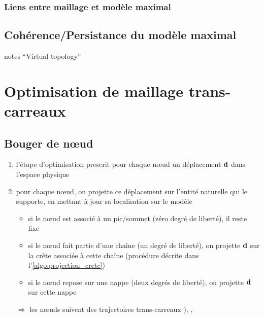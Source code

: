 \subsubsection{Liens entre maillage et modèle maximal}



\subsection{Cohérence/Persistance du modèle maximal}
\cf notes ``Virtual topology''









\section{Optimisation de maillage trans-carreaux}

\subsection{Bouger de n\oe ud}
\label{section:projection_surface_composite}
\begin{enumerate}
	\item l'étape d'optimisation prescrit pour chaque n\oe ud un déplacement $\mathbf{d}$ dans l'espace physique
	\item pour chaque n\oe ud, on projette ce déplacement sur l'entité naturelle qui le supporte, en mettant à jour sa localisation sur le modèle \brep
	\begin{itemize}
		\item si le n\oe ud est associé à un pic/sommet (zéro degré de liberté), il reste fixe 
		\item si le n\oe ud fait partie d'une chaîne (un degré de liberté), on projette $\mathbf{d}$ sur la crête associée à cette chaîne (procédure décrite dans l'\autoref{algo:projection_crete})
		\item si le n\oe ud repose sur une nappe (deux degrés de liberté), on projette $\mathbf{d}$ sur cette nappe
	\end{itemize}
	\item[$\Rightarrow$] les n\oe uds suivent des trajectoires trans-carreaux \cite[Section~5.5]{foucault2008}), \cite{thompson2005}, \cite[p.42 et Section~4.4.1]{crozet2017}
\end{enumerate}

